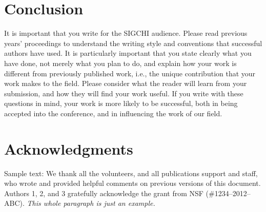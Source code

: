\documentclass{sigchi}
\begin{document}
\section{Conclusion}

It is important that you write for the SIGCHI audience. Please read
previous years' proceedings to understand the writing style and
conventions that successful authors have used. It is particularly
important that you state clearly what you have done, not merely what
you plan to do, and explain how your work is different from previously
published work, i.e., the unique contribution that your work makes to
the field. Please consider what the reader will learn from your
submission, and how they will find your work useful. If you write with
these questions in mind, your work is more likely to be successful,
both in being accepted into the conference, and in influencing the
work of our field.

\section{Acknowledgments}

Sample text: We thank all the volunteers, and all publications support
and staff, who wrote and provided helpful comments on previous
versions of this document. Authors 1, 2, and 3 gratefully acknowledge
the grant from NSF (\#1234--2012--ABC). \textit{This whole paragraph is
  just an example.}

%
%
%
%
%
\balance{}
\end{document}
